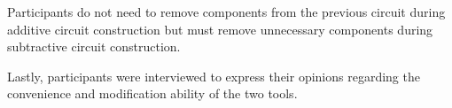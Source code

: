 Participants do not need to remove components from the previous circuit during additive circuit construction but must remove unnecessary components during subtractive circuit construction.

Lastly, participants were interviewed to express their opinions regarding the convenience and modification ability of the two tools.







